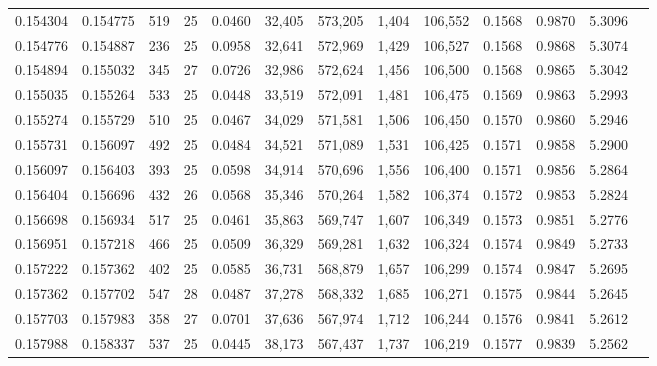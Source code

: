 \begin{tabular}{rrrrrrrrrrrrr}
0.154304 & 0.154775 &   519 &  25 &                                     0.0460 &  32,405 & 573,205 &   1,404 & 106,552 & 0.1568 & 0.9870 & 5.3096 \\
0.154776 & 0.154887 &   236 &  25 &                                     0.0958 &  32,641 & 572,969 &   1,429 & 106,527 & 0.1568 & 0.9868 & 5.3074 \\
0.154894 & 0.155032 &   345 &  27 &                                     0.0726 &  32,986 & 572,624 &   1,456 & 106,500 & 0.1568 & 0.9865 & 5.3042 \\
0.155035 & 0.155264 &   533 &  25 &                                     0.0448 &  33,519 & 572,091 &   1,481 & 106,475 & 0.1569 & 0.9863 & 5.2993 \\
0.155274 & 0.155729 &   510 &  25 &                                     0.0467 &  34,029 & 571,581 &   1,506 & 106,450 & 0.1570 & 0.9860 & 5.2946 \\
0.155731 & 0.156097 &   492 &  25 &                                     0.0484 &  34,521 & 571,089 &   1,531 & 106,425 & 0.1571 & 0.9858 & 5.2900 \\
0.156097 & 0.156403 &   393 &  25 &                                     0.0598 &  34,914 & 570,696 &   1,556 & 106,400 & 0.1571 & 0.9856 & 5.2864 \\
0.156404 & 0.156696 &   432 &  26 &                                     0.0568 &  35,346 & 570,264 &   1,582 & 106,374 & 0.1572 & 0.9853 & 5.2824 \\
0.156698 & 0.156934 &   517 &  25 &                                     0.0461 &  35,863 & 569,747 &   1,607 & 106,349 & 0.1573 & 0.9851 & 5.2776 \\
0.156951 & 0.157218 &   466 &  25 &                                     0.0509 &  36,329 & 569,281 &   1,632 & 106,324 & 0.1574 & 0.9849 & 5.2733 \\
0.157222 & 0.157362 &   402 &  25 &                                     0.0585 &  36,731 & 568,879 &   1,657 & 106,299 & 0.1574 & 0.9847 & 5.2695 \\
0.157362 & 0.157702 &   547 &  28 &                                     0.0487 &  37,278 & 568,332 &   1,685 & 106,271 & 0.1575 & 0.9844 & 5.2645 \\
0.157703 & 0.157983 &   358 &  27 &                                     0.0701 &  37,636 & 567,974 &   1,712 & 106,244 & 0.1576 & 0.9841 & 5.2612 \\
0.157988 & 0.158337 &   537 &  25 &                                     0.0445 &  38,173 & 567,437 &   1,737 & 106,219 & 0.1577 & 0.9839 & 5.2562 \\

\end{tabular}
